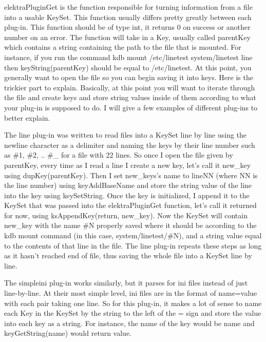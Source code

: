 {\ttfamily elektra\+Plugin\+Get} is the function responsible for turning information from a file into a usable Key\+Set. This function usually differs pretty greatly between each plug-\/in. This function should be of type int, it returns 0 on success or another number on an error. The function will take in a Key, usually called {\ttfamily parent\+Key} which contains a string containing the path to the file that is mounted. For instance, if you run the command {\ttfamily kdb mount /etc/linetest system/linetest line} then {\ttfamily key\+String(parent\+Key)} should be equal to {\ttfamily /etc/linetest}. At this point, you generally want to open the file so you can begin saving it into keys. Here is the trickier part to explain. Basically, at this point you will want to iterate through the file and create keys and store string values inside of them according to what your plug-\/in is supposed to do. I will give a few examples of different plug-\/ins to better explain.

The line plug-\/in was written to read files into a Key\+Set line by line using the newline character as a delimiter and naming the keys by their line number such as {\ttfamily \#1}, {\ttfamily \#2}, .. {\ttfamily \#\+\_} for a file with 22 lines. So once I open the file given by {\ttfamily parent\+Key}, every time as I read a line I create a new key, let's call it new\+\_\+key using dup\+Key(parent\+Key). Then I set new\+\_\+keys's name to line\+N\+N (where N\+N is the line number) using {\ttfamily key\+Add\+Base\+Name} and store the string value of the line into the key using {\ttfamily key\+Set\+String}. Once the key is initialized, I append it to the Key\+Set that was passed into the elektra\+Plugin\+Get function, let's call it returned for now, using {\ttfamily ks\+Append\+Key(return, new\+\_\+key)}. Now the Key\+Set will contain {\ttfamily new\+\_\+key} with the name {\ttfamily \#\+N} properly saved where it should be according to the {\ttfamily kdb mount} command (in this case, {\ttfamily system/linetest/\#\+N}), and a string value equal to the contents of that line in the file. The line plug-\/in repeats these steps as long as it hasn't reached end of file, thus saving the whole file into a Key\+Set line by line.

The simpleini plug-\/in works similarly, but it parses for ini files instead of just line-\/by-\/line. At their most simple level, ini files are in the format of {\ttfamily name=value} with each pair taking one line. So for this plug-\/in, it makes a lot of sense to name each Key in the Key\+Set by the string to the left of the {\ttfamily =} sign and store the value into each key as a string. For instance, the name of the key would be {\ttfamily name} and {\ttfamily key\+Get\+String(name)} would return {\ttfamily value}.

